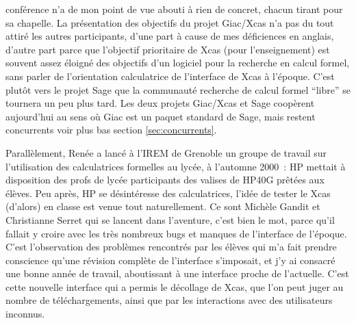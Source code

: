 \documentclass[a4paper,11pt]{article}
\begin{document}
\begin{giacjshere}
conf\'erence n'a de mon point de vue abouti \`a rien de concret,
chacun tirant pour sa chapelle. La pr\'esentation des objectifs du projet 
Giac/Xcas n'a pas du tout attir\'e les autres participants,
d'une part \`a cause de mes d\'eficiences en anglais,
d'autre part parce que l'objectif prioritaire de Xcas (pour l'enseignement)
est souvent assez \'eloign\'e des objectifs d'un logiciel
pour la recherche en calcul formel, sans parler de l'orientation
calculatrice de l'interface de Xcas \`a l'\'epoque.
C'est plut\^ot vers le projet Sage que la
communaut\'e recherche de calcul formel ``libre'' se tournera un peu
plus tard. Les deux projets Giac/Xcas et Sage coop\`erent aujourd'hui
au sens o\`u Giac est un paquet standard de Sage, mais restent concurrents 
voir plus bas section \ref{sec:concurrents}.

Parall\`element, Ren\'ee a lanc\'e \`a l'IREM de Grenoble
un groupe de travail sur l'utilisation des calculatrices
formelles au lyc\'ee, \`a l'automne 2000~:
HP mettait \`a disposition
des profs de lyc\'ee participants des valises de HP40G
pr\^et\'ees aux \'el\`eves. Peu apr\`es, HP se d\'esint\'eresse
des calculatrices, l'id\'ee de tester le Xcas (d'alors) en classe
est venue tout naturellement. Ce sont Mich\`ele Gandit et
Christianne Serret qui se lancent dans l'aventure, c'est bien
le mot, parce qu'il fallait y croire avec les tr\`es nombreux
bugs et manques de l'interface de l'\'epoque. C'est
l'observation des probl\`emes rencontr\'es par les \'el\`eves
qui m'a fait prendre conscience qu'une r\'evision compl\`ete
de l'interface s'imposait, et j'y ai consacr\'e une bonne ann\'ee
de travail, aboutissant \`a une interface proche de l'actuelle.
C'est cette nouvelle interface qui a permis le
d\'ecollage de Xcas, que l'on peut juger
au nombre de t\'el\'echargements, ainsi que par
les interactions avec des utilisateurs inconnus.


\end{giacjshere}
\end{document}
